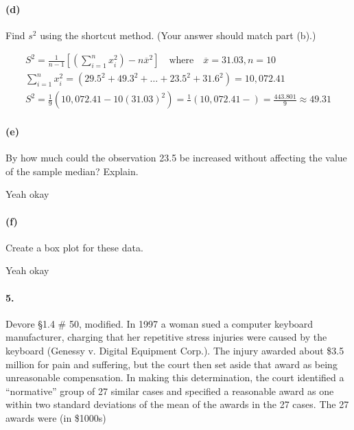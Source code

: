     \paragraph*{(d)}
    Find $s^2$ using the shortcut method. (Your answer should match part (b).)
    
    \begin{mdframed}
        \begin{equation*}
            \begin{gathered}
                S^2 = \frac{1}{n-1}\left[\left(\sum_{i=1}^{n}x_{i}^{2}\right)-n\overline{x}^{2}\right] \quad \text{where} \quad \overline{x}=31.03, n = 10 \\
                \sum_{i=1}^{n}x_{i}^{2} = (29.5^2 + 49.3^2 + \dots + 23.5^2 + 31.6^2) = 10,072.41   \\
                S^2 = \frac{1}{9}\left(10,072.41 - 10(31.03)^2\right) = \frac{1}{}\left(10,072.41 - \right)  = \frac{443.801}{9} \approx \boxed{49.31}
            \end{gathered}
        \end{equation*}
    \end{mdframed}

    \paragraph*{(e)}
    By how much could the observation 23.5 be increased without affecting the value of the sample median? Explain.
    
    \begin{mdframed}
        Yeah okay
    \end{mdframed}

    \paragraph*{(f)}
    Create a box plot for these data.

    \begin{mdframed}
        Yeah okay
    \end{mdframed}

    \paragraph*{5.}
    Devore \S1.4 \# 50, modified. In 1997 a woman sued a computer keyboard manufacturer, charging that her repetitive stress injuries were caused by the keyboard (Genessy v. Digital Equipment Corp.). The injury awarded about \$3.5 million for pain and suffering, but the court then set aside that award as being unreasonable compensation. In making this determination, the court identified a “normative” group of 27 similar cases and specified a reasonable award as one within two standard deviations of the mean of the awards in the 27 cases. The 27 awards were (in \$1000s) 
    
